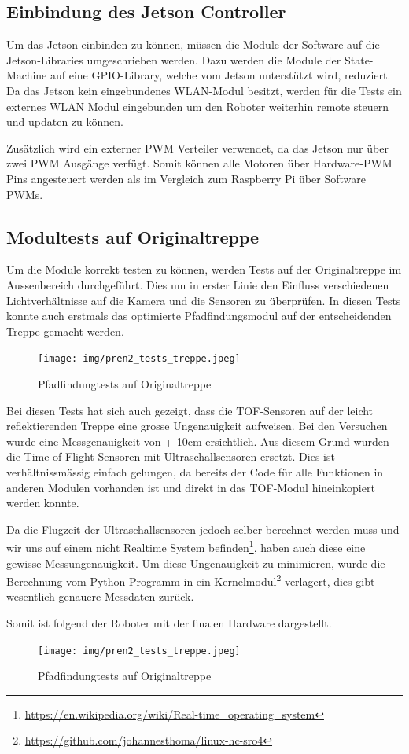  \subsection{Einbindung des Jetson Controller}

 Um das Jetson einbinden zu können, müssen die Module der Software auf die Jetson-Libraries umgeschrieben werden. Dazu werden die Module der State-Machine auf eine GPIO-Library, welche vom Jetson unterstützt wird, reduziert. Da das Jetson kein eingebundenes WLAN-Modul besitzt, werden für die Tests ein externes WLAN Modul eingebunden um den Roboter weiterhin remote steuern und updaten zu können.
 
 Zusätzlich wird ein externer PWM Verteiler verwendet, da das Jetson nur über zwei PWM Ausgänge verfügt. Somit können alle Motoren über Hardware-PWM Pins angesteuert werden als im Vergleich zum Raspberry Pi über Software PWMs. 
 
 
 \subsection{Modultests auf Originaltreppe}

Um die Module korrekt testen zu können, werden Tests auf der Originaltreppe im Aussenbereich durchgeführt. Dies um in erster Linie den Einfluss verschiedenen Lichtverhältnisse auf die Kamera und die Sensoren zu überprüfen. In diesen Tests konnte auch erstmals das optimierte Pfadfindungsmodul auf der entscheidenden Treppe gemacht werden.

   \begin{figure}[H]
  \texttt{[image: img/pren2\_tests\_treppe.jpeg]}
  \centering
  \caption{Pfadfindungtests auf Originaltreppe}
  \label{fig:Tests auf Originaltreppe}
  \end{figure}
  
  Bei diesen Tests hat sich auch gezeigt, dass die TOF-Sensoren auf der leicht reflektierenden Treppe eine grosse Ungenauigkeit aufweisen. Bei den Versuchen wurde eine Messgenauigkeit von +-10cm ersichtlich. Aus diesem Grund wurden die Time of Flight Sensoren mit Ultraschallsensoren ersetzt. Dies ist verhältnissmässig einfach gelungen, da bereits der Code für alle Funktionen in anderen Modulen vorhanden ist und direkt in das TOF-Modul hineinkopiert werden konnte.
  
  Da die Flugzeit der Ultraschallsensoren jedoch selber berechnet werden muss und wir uns auf einem nicht Realtime System 
  befinden\footnote{\url{https://en.wikipedia.org/wiki/Real-time_operating_system}}, haben auch diese eine gewisse Messungenauigkeit.
  Um diese Ungenauigkeit zu minimieren, wurde die Berechnung vom Python Programm in ein Kernelmodul\footnote{
    \url{https://github.com/johannesthoma/linux-hc-sro4}
  } verlagert, dies gibt wesentlich genauere Messdaten zurück.
  
 Somit ist folgend der Roboter mit der finalen Hardware dargestellt.
 
    \begin{figure}[H]
  \texttt{[image: img/pren2\_tests\_treppe.jpeg]}
  \centering
  \caption{Pfadfindungtests auf Originaltreppe}
  \label{fig:Tests auf Originaltreppe}
  \end{figure}
 
 
  
  
  
  
  
  
  
  
  





  